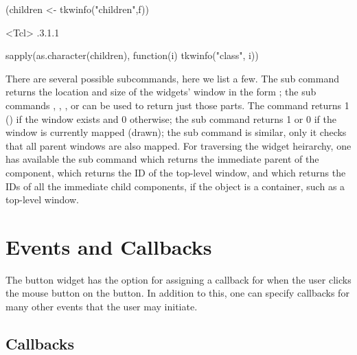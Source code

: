 \begin{Schunk}
\begin{Sinput}
 (children <- tkwinfo("children",f))
\end{Sinput}
\begin{Soutput}
<Tcl> .3.1.1 
\end{Soutput}
\begin{Sinput}
 sapply(as.character(children), function(i) tkwinfo("class", i))
\end{Sinput}
\end{Schunk}

There are several possible subcommands, here we list a few. The
 sub command returns the location and
size of the widgets' window in the form ;
the sub commands ,
, , or
 can be used to return just those parts. The
 command returns 1 () if the
window exists and 0 otherwise; the  sub
command returns 1 or 0 if the window is currently mapped (drawn); the
 sub command is similar, only it checks
that all parent windows are also mapped.  For traversing the widget
heirarchy, one has available the  sub
command which returns the immediate parent of the component,
 which returns the ID of the top-level
window, and  which returns the IDs of
all the immediate child components, if the object is a container, such
as a top-level window.



\section{Events and Callbacks}
\label{sec:tcltk:overview:events-callbacks}

The button widget has the  option for assigning a
callback for when the user clicks the mouse button on the button. In
addition to this, one can specify callbacks for many other events that
the user may initiate.


\subsection{Callbacks}
\label{sec:tcltk:callbacks}

